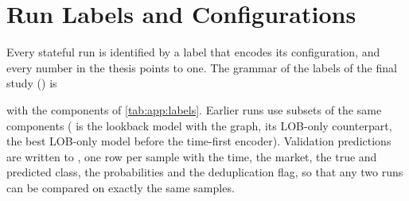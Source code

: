 \chapter{Run Labels and Configurations}
\label{app:runs}

Every stateful run is identified by a label that encodes its configuration, and every
number in the thesis points to one.  The grammar of the labels of the final study
() is
\begin{center}
\end{center}
with the components of \cref{tab:app:labels}.  Earlier runs use subsets of the same
components ( is the lookback model with the graph,
 its LOB-only counterpart, 
the best LOB-only model before the time-first encoder).  Validation predictions are written
to , one row per sample with the time, the market,
the true and predicted class, the probabilities and the deduplication flag, so that any two
runs can be compared on exactly the same samples.

